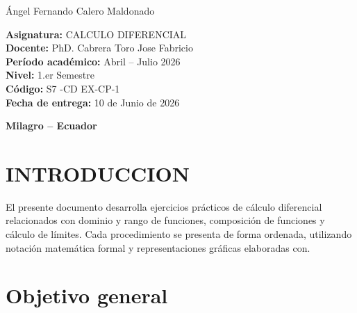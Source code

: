 \documentclass[12pt,a4paper]{article}
\begin{document}
\begin{titlepage}
\begin{minipage}{0.95\textwidth}
			{\Large\color{azulUNEMI}
				\hspace*{1cm}Ángel Fernando Calero Maldonado\\
		}	
			\vspace{1.2cm}
			
			{\Large\color{naranjaUNEMI}
				\textbf{Asignatura:}}
			{\Large\color{azulUNEMI} CALCULO DIFERENCIAL}\\
			
			{\Large\color{naranjaUNEMI}
				\textbf{Docente:}}
			{\Large\color{azulUNEMI} PhD. Cabrera Toro Jose Fabricio}\\
			
			{\Large\color{naranjaUNEMI}
				\textbf{Período académico:}}
			{\Large\color{azulUNEMI} Abril -- Julio 2026}\\
			
			{\Large\color{naranjaUNEMI}
				\textbf{Nivel:}}
			{\Large\color{azulUNEMI} 1.er Semestre}\\
			
			{\Large\color{naranjaUNEMI}
				\textbf{Código:}}
			{\Large\color{azulUNEMI} S7 -CD EX-CP-1}\\
			
			{\Large\color{naranjaUNEMI}
				\textbf{Fecha de entrega:}}
			{\Large\color{azulUNEMI} 10 de Junio de 2026}
			
		\end{minipage}
		
		\vfill
		
		{\large
			\color{azulUNEMI}
			\textbf{Milagro -- Ecuador}\par}
		
	\end{titlepage}
	

	\section{INTRODUCCION}
	
	El presente documento desarrolla ejercicios prácticos de cálculo diferencial relacionados con dominio y rango de funciones, composición de funciones y cálculo de límites. Cada procedimiento se presenta de forma ordenada, utilizando notación matemática formal y representaciones gráficas elaboradas con.
	
	\section{Objetivo general}
	
\end{document}
